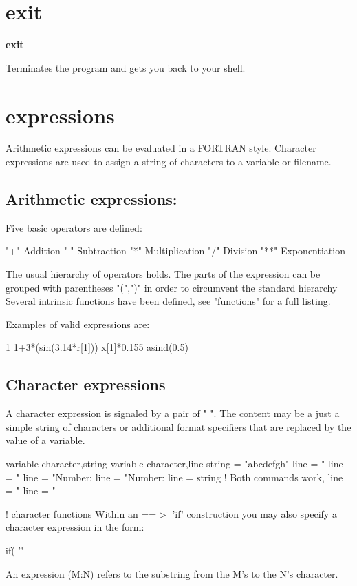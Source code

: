 \section{exit}
{\bf exit \par }
\par
\vspace{3pt}
Terminates the program and gets you back to your shell. 
\section{expressions}
\par
Arithmetic expressions can be evaluated in a FORTRAN style. 
Character expressions are used to assign a string of characters to 
a variable or filename. 
\par
\subsection*{Arithmetic expressions:}
\par
Five basic operators are defined: 
\par
\begin{MacVerbatim}
"+"  Addition
"-"  Subtraction
"*"  Multiplication
"/"  Division
"**" Exponentiation
\end{MacVerbatim}
The usual hierarchy of operators holds. 
The parts of the expression can be grouped with parentheses "(",")" in 
order to circumvent the standard hierarchy 
Several intrinsic functions have been defined, see "functions" for a 
full listing. 
\par
Examples of valid expressions are: 
\par
\begin{MacVerbatim}
1
1+3*(sin(3.14*r[1]))
x[1]*0.155
asind(0.5)
\end{MacVerbatim}
\subsection*{Character expressions}
\par
A character expression is signaled by a pair of " ". The content may 
be a just a simple string of characters or additional format 
specifiers that are replaced by the value of a variable. 
\par
\begin{MacVerbatim}
variable character,string
variable character,line
string = "abcdefgh"
line   = "%
line   = "%
line   = "Number: %
line   = "Number: %
line   = string          ! Both commands work,
line   = "%
line   = "%
\end{MacVerbatim}
                         ! character functions 
Within an ==$> $ 'if' construction you may also specify a character 
expression in the form: 
\par
\begin{MacVerbatim}
if( '"%
\end{MacVerbatim}
An expression (M:N) refers to the substring from the M's to the N's 
character. 
\par
